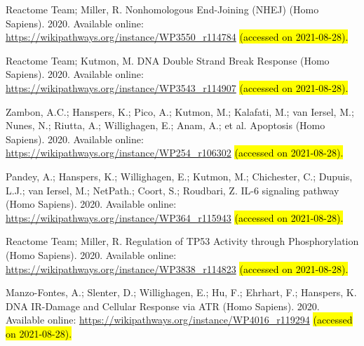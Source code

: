 \documentclass[ijms,article,accept,moreauthors,pdftex]{Definitions/mdpi}
\begin{document}
\begin{thebibliography}{999}
{Reactome Team}; Miller, R.
\newblock Nonhomologous End-Joining (NHEJ) (Homo Sapiens).  2020.
\newblock Available online: \url{https://wikipathways.org/instance/WP3550_r114784} \hl{(accessed on 2021-08-28). } %

{Reactome Team}; Kutmon, M.
\newblock DNA Double Strand Break Response (Homo Sapiens).  2020.
\newblock Available online: \url{https://wikipathways.org/instance/WP3543_r114907} \hl{(accessed on 2021-08-28). } %

Zambon, A.C.; Hanspers, K.; Pico, A.; Kutmon, M.; Kalafati, M.; van Iersel, M.;
  Nunes, N.; Riutta, A.; Willighagen, E.; Anam, A.; et al.
\newblock Apoptosis (Homo Sapiens).  2020.
\newblock Available online: \url{https://wikipathways.org/instance/WP254_r106302} \hl{(accessed on 2021-08-28). } %

Pandey, A.; Hanspers, K.;  Willighagen, E.; Kutmon, M.; Chichester,
  C.; Dupuis, L.J.; van Iersel, M.; NetPath.; Coort, S.; Roudbari, Z.
\newblock IL-6 signaling pathway (Homo Sapiens).  2020.
\newblock Available online: \url{https://wikipathways.org/instance/WP364_r115943} \hl{(accessed on 2021-08-28). } %

{Reactome Team}; Miller, R.
\newblock Regulation of TP53 Activity through Phosphorylation (Homo Sapiens).  2020.
\newblock Available online: \url{https://wikipathways.org/instance/WP3838_r114823} \hl{(accessed on 2021-08-28). } %

Manzo-Fontes, A.; Slenter, D.; Willighagen, E.; Hu, F.; Ehrhart, F.; Hanspers,
  K.
\newblock DNA IR-Damage and Cellular Response via ATR (Homo Sapiens).  2020.
\newblock Available online: \url{https://wikipathways.org/instance/WP4016_r119294} \hl{(accessed on 2021-08-28). } %


\end{thebibliography}
\end{document}
